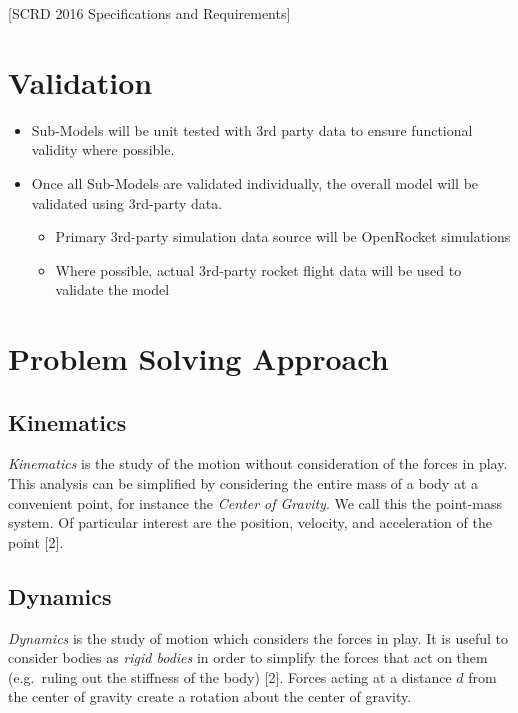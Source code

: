 \documentclass[]{book}
\providecommand{\tightlist}{%
  \setlength{\itemsep}{0pt}\setlength{\parskip}{0pt}}
\begin{document}
{[}SCRD 2016 Specifications and Requirements{]}

\section{Validation}\label{validation}

\begin{itemize}
\tightlist
\item
  Sub-Models will be unit tested with 3rd party data to ensure
  functional validity where possible.
\item
  Once all Sub-Models are validated individually, the overall model will
  be validated using 3rd-party data.

  \begin{itemize}
  \tightlist
  \item
    Primary 3rd-party simulation data source will be OpenRocket
    simulations
  \item
    Where possible, actual 3rd-party rocket flight data will be used to
    validate the model
  \end{itemize}
\end{itemize}

\section{Problem Solving Approach}\label{problem-solving-approach}

\subsection{Kinematics}\label{kinematics}

\emph{Kinematics} is the study of the motion without consideration of
the forces in play. This analysis can be simplified by considering the
entire mass of a body at a convenient point, for instance the
\emph{Center of Gravity}. We call this the point-mass system. Of
particular interest are the position, velocity, and acceleration of the
point {[}2{]}.

\subsection{Dynamics}\label{dynamics}

\emph{Dynamics} is the study of motion which considers the forces in
play. It is useful to consider bodies as \emph{rigid bodies} in order to
simplify the forces that act on them (e.g.~ruling out the stiffness of
the body) {[}2{]}. Forces acting at a distance \(d\) from the center of
gravity create a rotation about the center of gravity.
\end{document}
